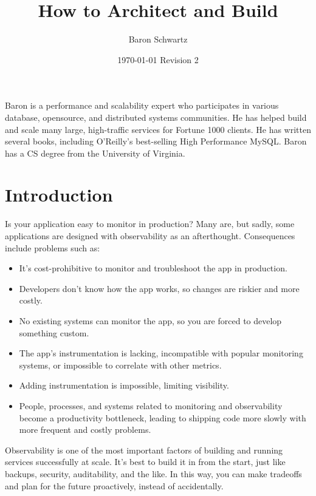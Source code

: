 \documentclass{vivid_layout}
\title{\fontsize{32pt}{15pt}\selectfont How to Architect and Build}{\fontsize{30.2pt}{15pt}\selectfont Highly Observable Systems}
\date{\color{white} \today{} \textbullet{} Revision 2}
\author{Baron Schwartz}{img/baron}
\begin{document}
\maketitle		%
\begin{bio}		%
Baron is a performance and scalability expert who participates in various
database, opensource, and distributed systems communities. He has helped build
and scale many large, high-traffic services for Fortune 1000 clients. He has
written several books, including O'Reilly's best-selling High Performance MySQL.
Baron has a CS degree from the University of Virginia.
\end{bio}
\tableofcontents	%

\section{Introduction}

Is your application easy to monitor in production? Many are, but
sadly, some applications are designed with observability as an afterthought.
Consequences include problems such as:

\begin{itemize}
\item It's cost-prohibitive to monitor and troubleshoot the app in production.
\item Developers don't know how the app works, so changes are riskier and more costly.
\item No existing systems can monitor the app, so you are forced to develop
something custom.
\item The app's instrumentation is lacking, incompatible with popular monitoring
systems, or impossible to correlate with other metrics.
\item Adding instrumentation is impossible, limiting visibility.
\item People, processes, and systems related to monitoring and observability become
a productivity bottleneck, leading to shipping code more slowly with more frequent
and costly problems.
\end{itemize}

Observability is one of the most important factors of building and running services
successfully at scale. It's best to build it in from the start, just
like backups, security, auditability, and the like. In this way, you can make tradeoffs
and plan for the future proactively, instead of accidentally.
\end{document}
